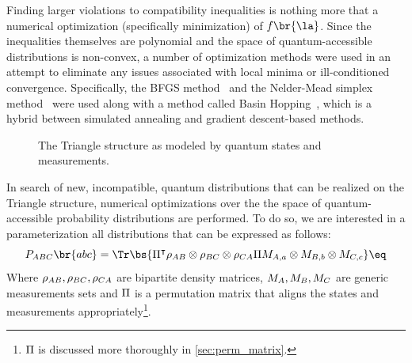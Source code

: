 \documentclass[aps, 10pt, english, twoside, pra, nofootinbib, tightenlines, longbibliography, superscriptaddress]{revtex4-1}
\begin{document}
    Finding larger violations to compatibility inequalities is nothing more that a numerical optimization (specifically minimization) of $f\br{\la}$. Since the inequalities themselves are polynomial and the space of quantum-accessible distributions is non-convex, a number of optimization methods were used in an attempt to eliminate any issues associated with local minima or ill-conditioned convergence. Specifically, the BFGS method~\cite[p. 142]{Nocedal_2000} and the Nelder-Mead simplex method~\cite[p. 238]{Nocedal_2000} were used along with a method called Basin Hopping~\cite{Wales_1997}, which is a hybrid between simulated annealing and gradient descent-based methods.

    \begin{figure}
    \begin{center}
            \scalebox{1.0}{}
            \caption{The Triangle structure as modeled by quantum states and measurements.}
            \label{fig:triangle_structure_quantum_model}
    \end{center}
    \end{figure}
    In search of new, incompatible, quantum distributions that can be realized on the Triangle structure, numerical optimizations over the the space of quantum-accessible probability distributions are performed. To do so, we are interested in a parameterization all distributions that can be expressed as follows:
    \[ \prob[\p{ABC}]\br{abc} = \Tr\bs{\netperm^\intercal \rho_{\p{AB}}\otimes\rho_{\p{BC}}\otimes\rho_{\p{CA}} \netperm M_{\p{A},a}\otimes M_{\p{B},b} \otimes M_{\p{C},c}} \eq \label{eq:quantum_model_triangle}\]
    Where $\rho_{AB}, \rho_{BC}, \rho_{CA}$ are bipartite density matrices, $M_{A}, M_{B}, M_{C}$ are generic measurements sets and $\Pi$ is a permutation matrix that aligns the states and measurements appropriately\footnote{$\Pi$ is discussed more thoroughly in \cref{sec:perm_matrix}.}.
\end{document}
